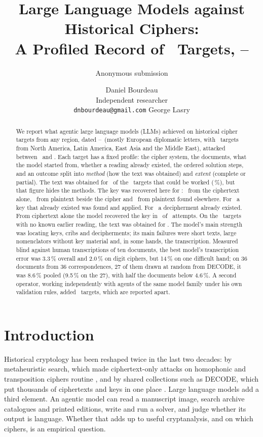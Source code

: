 \documentclass[11pt]{article}
\title{Large Language Models against Historical Ciphers: \\ A Profiled Record of \Ntargets\ Targets, \YearMin--\YearMax}
\author{Anonymous submission}
\author{Daniel Bourdeau \\ Independent researcher \\ {\tt dnbourdeau@gmail.com} \And George Lasry}
\date{}
\begin{document}
\maketitle

\begin{abstract}
We report what agentic large language models (LLMs) achieved on historical cipher targets from any region, dated \YearMin--\YearMax\ (mostly European diplomatic letters, with \NnonEurope\ targets from North America, Latin America, East Asia and the Middle East), attacked between \DateFirst\ and \DateLast. Each target has a fixed profile: the cipher system, the documents, what the model started from, whether a reading already existed, the ordered solution steps, and an outcome split into \emph{method} (how the text was obtained) and \emph{extent} (complete or partial). The text was obtained for \Nobtained\ of the \Nworked\ targets that could be worked (\PctObtained\,\%), but that figure hides the methods. The key was recovered here for \Nrecovered: \NCT\ from the ciphertext alone, \NAPT\ from plaintext beside the cipher and \NEPT\ from plaintext found elsewhere. For \Napplied\ a key that already existed was found and applied. For \Ndeciph\ a decipherment already existed. From ciphertext alone the model recovered the key in \NctoCT\ of \Ncto\ attempts. On the \Nclean\ targets with no known earlier reading, the text was obtained for \Ncleanobtained. The model's main strength was locating keys, cribs and decipherments; its main failures were short texts, large nomenclators without key material and, in some hands, the transcription. Measured blind against human transcriptions of ten documents, the best model's transcription error was 3.3\,\% overall and 2.0\,\% on digit ciphers, but 14\,\% on one difficult hand; on 36 documents from 36 correspondences, 27 of them drawn at random from DECODE, it was 8.6\,\% pooled (9.5\,\% on the 27), with half the documents below 4.6\,\%. A second operator, working independently with agents of the same model family under his own validation rules, added \NB\ targets, which are reported apart.
\end{abstract}

\section{Introduction}

Historical cryptology has been reshaped twice in the last two decades: by metaheuristic search, which made ciphertext-only attacks on homophonic and transposition ciphers routine \cite{Lasry:2018}, and by shared collections such as DECODE, which put thousands of ciphertexts and keys in one place \cite{Megyesi:2019,Megyesi:2020}. Large language models add a third element. An agentic model can read a manuscript image, search archive catalogues and printed editions, write and run a solver, and judge whether its output is language. Whether that adds up to useful cryptanalysis, and on which ciphers, is an empirical question.
\end{document}
